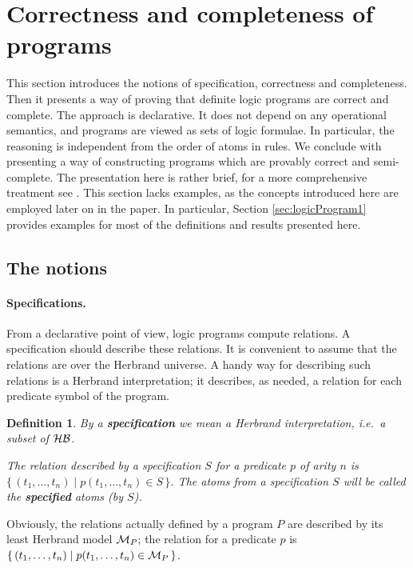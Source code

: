\documentclass{tlp}
\newtheorem{definition}[theorem]{Definition}
\newcommand*{\HB}{{\ensuremath{\cal{H B}}}\xspace}
\newcommand*{\M}{{\ensuremath{\cal M}}\xspace}
\begin{document}
\section{Correctness and completeness of programs}
\label{sec:corr-compl}
This section introduces the notions of specification, correctness and
completeness.  Then it presents a way of proving that definite logic programs
are correct and complete.  The approach is declarative.  
It does not depend on any operational semantics, and
programs are viewed as sets of logic formulae.
In particular, the reasoning is independent from the order of atoms in rules.
We conclude with presenting a way of constructing programs which are provably
correct and semi-complete.
The presentation here is rather brief,
for a more comprehensive treatment see  \cite{drabent.tocl16}.
This section lacks examples,
as the concepts introduced here are employed later on in the paper.
In particular, Section \ref{sec:logicProgram1} provides examples 
for most of the definitions and results presented here.



\subsection{The notions}
\label{subsec:notions}

\paragraph{Specifications.}
From a declarative point of view, logic programs compute relations. 
A specification should describe these relations.
It is convenient to assume that the relations are over the Herbrand universe. 
A handy way for describing such relations is a Herbrand interpretation;
it describes, as needed, a relation for each predicate symbol of the program.
\begin{definition}
  \label{def:specification}
  By a {\bf specification} we mean a Herbrand interpretation, i.e.\ a
  subset of \HB.

The relation described by a specification $S$ for a predicate $p$
  of arity $n$ is
  {$\{\, (t_1,\ldots,t_n)  \mid p(t_1,\ldots,t_n)\in S \,\}$}.
The atoms from a specification $S$ will be called the 
  {\bf specified} atoms (by $S$).
\sloppy
\end{definition}
Obviously,
 the relations actually defined by a program $P$ are described by its
least {Herbrand} model $\M_P$; the relation for a predicate $p$ is
{$\{\, (t_1,\ldots,t_n)  \mid p(t_1,\ldots,t_n)\in \M_P \,\}$.}
\end{document}
